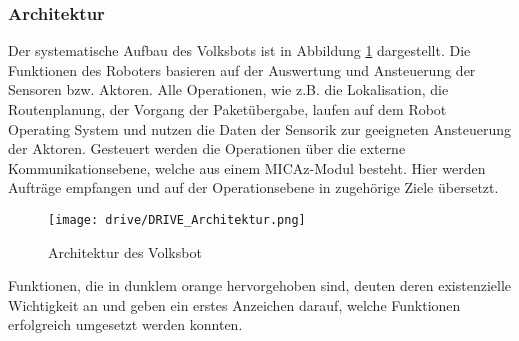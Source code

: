 \subsubsection{Architektur}

Der systematische Aufbau des Volksbots ist in Abbildung \ref{fig:architecture_volksbot} dargestellt. Die Funktionen des Roboters basieren auf der Auswertung und Ansteuerung der Sensoren bzw. Aktoren. Alle Operationen, wie z.B. die Lokalisation, die Routenplanung, der Vorgang der Paketübergabe, laufen auf dem Robot Operating System und nutzen die Daten der Sensorik zur geeigneten Ansteuerung der Aktoren. Gesteuert werden die Operationen über die externe Kommunikationsebene, welche aus einem MICAz-Modul besteht. Hier werden Aufträge empfangen und auf der Operationsebene in zugehörige Ziele übersetzt.

\begin{figure}[h!]
 \centering
		\texttt{[image: drive/DRIVE\_Architektur.png]}
	\caption{Architektur des Volksbot}
	\label{fig:architecture_volksbot}
\end{figure}

Funktionen, die in dunklem orange hervorgehoben sind, deuten deren existenzielle Wichtigkeit an und geben ein erstes Anzeichen darauf, welche Funktionen erfolgreich umgesetzt werden konnten.